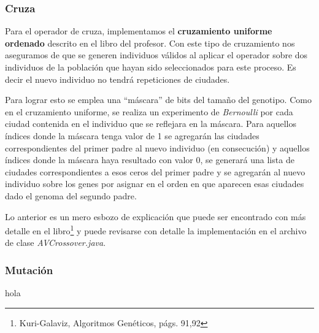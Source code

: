 \documentclass[12pt]{article}
\begin{document}
\subsubsection*{Cruza}
Para el operador de cruza, implementamos el \textbf{cruzamiento uniforme ordenado}
descrito en el libro del profesor. Con este tipo de cruzamiento nos aseguramos
de que se generen individuos válidos al aplicar el operador sobre dos individuos
de la población que hayan sido seleccionados para este proceso. Es decir
el nuevo individuo no tendrá repeticiones de ciudades.\par
Para lograr esto se emplea una ``máscara'' de bits del tamaño del genotipo.
Como en el cruzamiento uniforme, se realiza un experimento de \textit{Bernoulli}
por cada ciudad contenida en el individuo que se reflejara en la máscara.
Para aquellos índices donde la máscara tenga valor de 1 se agregarán las ciudades
correspondientes del primer padre al nuevo individuo (en consecución) y
aquellos índices donde la máscara haya resultado con valor 0, se generará una
lista de ciudades correspondientes a esos ceros del primer padre y se agregarán
al nuevo individuo sobre los genes por asignar en el orden en que aparecen esas
ciudades dado el genoma del segundo padre.\par
Lo anterior es un mero esbozo de explicación que puede ser encontrado con más
detalle en el libro\footnote{Kuri-Galaviz, Algoritmos Genéticos, págs. 91,92} y
puede revisarse con detalle la implementación en el archivo de clase
\textit{AVCrossover.java}.
\subsubsection*{Mutación}

hola
\end{document}
